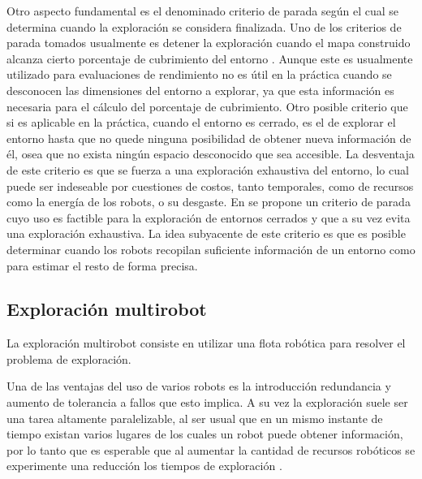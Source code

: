 
Otro aspecto fundamental es el denominado criterio de parada según el cual se
determina cuando la exploración se considera finalizada. Uno de los criterios
de parada tomados usualmente es detener la exploración cuando el mapa
construido alcanza cierto porcentaje de cubrimiento del entorno
\cite{Yan2015}. Aunque este es usualmente utilizado para evaluaciones de
rendimiento no es útil en la práctica cuando se desconocen las dimensiones del
entorno a explorar, ya que esta información es necesaria para el cálculo del
porcentaje de cubrimiento.
Otro posible criterio que si es aplicable en la práctica, cuando el entorno es
cerrado, es el de explorar el entorno hasta que no quede ninguna posibilidad de
obtener nueva información de él, osea que no exista ningún espacio desconocido
que sea accesible. La desventaja de este criterio es que se fuerza a una
exploración exhaustiva del entorno, lo cual puede ser indeseable por cuestiones
de costos, tanto temporales, como de recursos como la energía de los robots, o
su desgaste. En \cite{amorin2019novel} se propone un criterio de parada cuyo
uso es factible para la exploración de entornos cerrados y que a
su vez evita una exploración exhaustiva. La idea subyacente de este criterio es
que es posible determinar cuando los robots recopilan suficiente información de
un entorno como para estimar el resto de forma precisa.



\subsection{Exploración multirobot}\label{subsec:expmutirob}
La exploración multirobot consiste en utilizar una flota robótica para resolver
el problema de exploración.

Una de las ventajas del uso de varios robots es la introducción redundancia y
aumento de tolerancia a fallos que esto implica. A su vez la exploración suele
ser una tarea altamente paralelizable, al ser usual que en un mismo instante de
tiempo existan varios lugares de los cuales un robot puede obtener información,
por lo tanto que es esperable que al aumentar la cantidad de recursos robóticos
se experimente una reducción los tiempos de exploración
\cite{cao1997cooperative,dudek1996taxonomy,guzzoni1997many}. 

